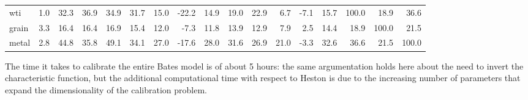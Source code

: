 \begin{table}
{\begin{tabular}{lrrrrrrrrrrrrrrrr}
    wti   & \cellcolor[rgb]{ .988,  .984,  .996}1.0 & \cellcolor[rgb]{ .984,  .804,  .816}32.3 & \cellcolor[rgb]{ .984,  .776,  .788}36.9 & \cellcolor[rgb]{ .984,  .788,  .8}34.9 & \cellcolor[rgb]{ .984,  .808,  .82}31.7 & \cellcolor[rgb]{ .988,  .902,  .914}15.0 & \cellcolor[rgb]{ .847,  .886,  .949}-22.2 & \cellcolor[rgb]{ .988,  .906,  .914}14.9 & \cellcolor[rgb]{ .988,  .882,  .89}19.0 & \cellcolor[rgb]{ .988,  .859,  .871}22.9 & \cellcolor[rgb]{ .988,  .953,  .965}6.7 & \cellcolor[rgb]{ .941,  .953,  .98}-7.1 & \cellcolor[rgb]{ .988,  .898,  .91}15.7 & \cellcolor[rgb]{ .973,  .412,  .42}100.0 & \cellcolor[rgb]{ .988,  .882,  .894}18.9 & \cellcolor[rgb]{ .984,  .78,  .788}36.6 \\
    grain & \cellcolor[rgb]{ .988,  .973,  .984}3.3 & \cellcolor[rgb]{ .988,  .894,  .906}16.4 & \cellcolor[rgb]{ .988,  .894,  .906}16.4 & \cellcolor[rgb]{ .988,  .894,  .906}16.9 & \cellcolor[rgb]{ .988,  .902,  .914}15.4 & \cellcolor[rgb]{ .988,  .922,  .933}12.0 & \cellcolor[rgb]{ .941,  .953,  .98}-7.3 & \cellcolor[rgb]{ .988,  .922,  .933}11.8 & \cellcolor[rgb]{ .988,  .91,  .922}13.9 & \cellcolor[rgb]{ .988,  .918,  .925}12.9 & \cellcolor[rgb]{ .988,  .945,  .957}7.9 & \cellcolor[rgb]{ .988,  .976,  .988}2.5 & \cellcolor[rgb]{ .988,  .906,  .918}14.4 & \cellcolor[rgb]{ .988,  .882,  .894}18.9 & \cellcolor[rgb]{ .973,  .412,  .42}100.0 & \cellcolor[rgb]{ .988,  .867,  .878}21.5 \\
    metal & \cellcolor[rgb]{ .988,  .973,  .984}2.8 & \cellcolor[rgb]{ .984,  .733,  .741}44.8 & \cellcolor[rgb]{ .984,  .784,  .792}35.8 & \cellcolor[rgb]{ .984,  .706,  .718}49.1 & \cellcolor[rgb]{ .984,  .792,  .804}34.1 & \cellcolor[rgb]{ .984,  .835,  .847}27.0 & \cellcolor[rgb]{ .875,  .906,  .957}-17.6 & \cellcolor[rgb]{ .984,  .827,  .839}28.0 & \cellcolor[rgb]{ .984,  .808,  .82}31.6 & \cellcolor[rgb]{ .984,  .835,  .847}26.9 & \cellcolor[rgb]{ .988,  .871,  .878}21.0 & \cellcolor[rgb]{ .965,  .973,  .992}-3.3 & \cellcolor[rgb]{ .984,  .804,  .812}32.6 & \cellcolor[rgb]{ .984,  .78,  .788}36.6 & \cellcolor[rgb]{ .988,  .867,  .878}21.5 & \cellcolor[rgb]{ .973,  .412,  .42}100.0 \\
    \end{tabular}%
	         }
\end{table}%

\bigskip
The time it takes to calibrate the entire Bates model is of about 5 hours: the same argumentation holds here about the need to invert the characteristic function, but the additional computational time with respect to Heston is due to the increasing number of parameters that expand the dimensionality of the calibration problem.

